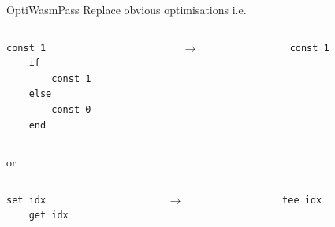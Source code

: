 \documentclass{beamer}
\begin{document}
\begin{frame}[fragile]{OptiWasmPass}
    Replace obvious optimisations i.e.
    
    \begin{columns}
\begin{column}{0.45\textwidth}
   \begin{lstlisting}[keywords={}, basicstyle=\ttfamily]
    const 1 
    if 
        const 1
    else
        const 0
    end
    \end{lstlisting}
\end{column}
\begin{column}{0.1\textwidth}
   $\rightarrow$
\end{column}
\begin{column}{0.45\textwidth}
   \begin{lstlisting}[keywords={}, basicstyle=\ttfamily]
    const 1
    \end{lstlisting}
\end{column}
\end{columns}
    or 
    \begin{columns}
    \begin{column}{0.45\textwidth}
   \begin{lstlisting}[keywords={}, basicstyle=\ttfamily]
    set idx
    get idx
    \end{lstlisting}
\end{column}
\begin{column}{0.1\textwidth}
   $\rightarrow$
\end{column}
\begin{column}{0.45\textwidth}
   \begin{lstlisting}[keywords={}, basicstyle=\ttfamily]
    tee idx
    \end{lstlisting}
\end{column}
\end{columns}
\end{frame}
\end{document}
